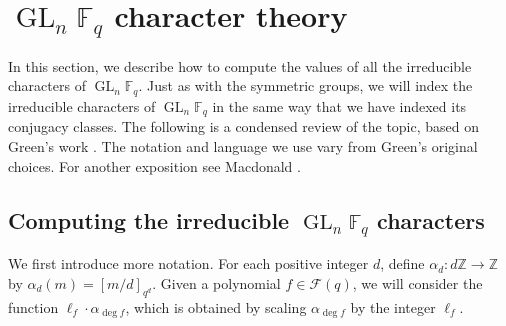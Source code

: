\documentclass[10pt]{article}
\theoremstyle{definition}
\DeclareMathOperator{\GL}{GL}
\newcommand{\F}{\mathbb{F}}
\newcommand{\CF}{\mathcal{F}}
\newcommand{\Z}{\mathbb{Z}}
\begin{document}
\section{\texorpdfstring{\(\GL_n \F_q\)}{GLn Fq} character theory}
\label{three}





In this section, we describe how to compute the values of all the irreducible characters of $\GL_n \F_q$.
Just as with the symmetric groups, we will index the irreducible characters of \(\GL_n \F_q\) in the same way that we have indexed its conjugacy classes.
The following is a condensed review of the topic, based on Green's work \cite{green}. The notation and language we use vary from Green's original choices. For another exposition see Macdonald \cite[{Chapter~IV}]{macD}.






\subsection{Computing the irreducible \texorpdfstring{$\GL_n \F_q$}{GLn Fq} characters} \label{char_vals}



We first introduce more notation.
For each positive integer \(d\), define \(\alpha_d : d\Z \to \Z\) by \(\alpha_d (m) = [m/d]_{q^{d}}\).
Given a polynomial \(f \in \CF (q)\), we will consider the function \(\ell_f \cdot \alpha_{\deg f}\), which is obtained by scaling \(\alpha_{\deg f}\) by the integer \(\ell_f\).
\end{document}
